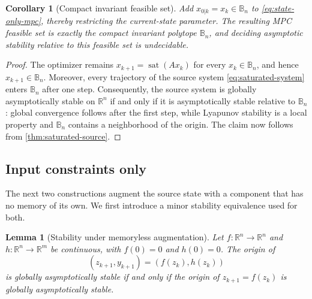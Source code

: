 \documentclass{IEEEtran}
\newtheorem{corollary}[theorem]{Corollary}
\newtheorem{lemma}[theorem]{Lemma}
\theoremstyle{remark}
\newcommand{\R}{\mathbb{R}}
\newcommand{\B}{\mathbb{B}}
\newcommand{\sat}{\operatorname{sat}}
\begin{document}
\begin{corollary}[Compact invariant feasible set]
\label{cor:compact-box}
Add $x_{0|k}=x_k\in\B_n$ to \eqref{eq:state-only-mpc}, thereby restricting
the current-state parameter.  The resulting MPC feasible set is exactly the
compact invariant polytope $\B_n$, and deciding asymptotic stability relative
to this feasible set is undecidable.
\end{corollary}

\begin{proof}
The optimizer remains $x_{k+1}=\sat(Ax_k)$ for every $x_k\in\B_n$, and hence $x_{k+1}\in\B_n$.  Moreover, every trajectory of the source system \eqref{eq:saturated-system} enters $\B_n$ after one step.  Consequently, the source system is globally asymptotically stable on $\R^n$ if and only if it is asymptotically stable relative to $\B_n$: global convergence follows after the first step, while Lyapunov stability is a local property and $\B_n$ contains a neighborhood of the origin.  The claim now follows from \cref{thm:saturated-source}.
\end{proof}

\subsection{Input constraints only}
\label{sec:input-only}

The next two constructions augment the source state with a component that has
no memory of its own.  We first introduce a minor stability equivalence used for both.

\begin{lemma}[Stability under memoryless augmentation]
\label{lem:static-augmentation}
Let $f:\R^n\to\R^n$ and $h:\R^n\to\R^m$ be continuous, with $f(0)=0$ and $h(0)=0$.  The origin of
\[
  (z_{k+1},y_{k+1})=(f(z_k),h(z_k))
\]
is globally asymptotically stable if and only if the origin of $z_{k+1}=f(z_k)$ is globally asymptotically stable.
\end{lemma}
\end{document}
